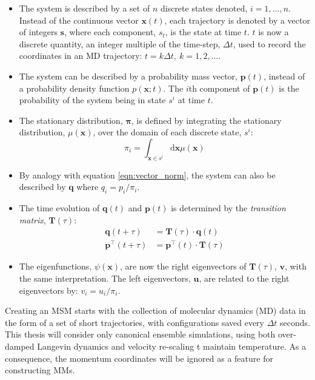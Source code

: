 \begin{itemize}
    \item The system is described by a set of $n$ discrete states denoted, $i=1, \ldots, n$. Instead of the continuous vector $\mathbf{x}(t)$, each trajectory is denoted by a vector of integers $\mathbf{s}$, where each component, $s_t$, is the state at time $t$. $t$ is now a discrete quantity, an integer multiple of the time-step, $\Delta t$, used to record the coordinates in an MD trajectory: $t=k\Delta t,\ k=1, 2, \ldots$. 
    \item The system can be described by a probability mass vector, $\mathbf{p}(t)$,  instead of a probability density function $p(\mathbf{x};t)$. The $i$th component of $\mathbf{p}(t)$ is the probability of the system being in  state $s^{i}$ at time $t$.
    \item The stationary distribution, $\bm{\pi}$, is defined by integrating the stationary distribution, $\mu(\mathbf{x})$, over the domain of each discrete state, $s^{i}$:
        \begin{equation*}
            \pi_{i}=\int_{\mathbf{x} \in s^{i}} \mathrm{d}\mathbf{x}\mu(\mathbf{x})
        \end{equation*}
    \item By analogy with equation \ref{eqn:vector_norm}, the system can also be described by $\mathbf{q}$ where $q_{i} = p_{i}/\pi_{i}$.
    \item The time evolution of $\mathbf{q}(t)$ and $\mathbf{p}(t)$ is determined by the \emph{transition matrix}, $\mathbf{T}(\tau)$:
        \begin{align*}
            \mathbf{q}(t+\tau) &= \mathbf{T}(\tau) \cdot \mathbf{q}(t) \\
            \mathbf{p}^{\top}(t+\tau) & = \mathbf{p}^{\top}(t)\cdot \mathbf{T}(\tau)
        \end{align*}
    \item The eigenfunctions, $\psi(\mathbf{x})$, are now the right eigenvectors of $\mathbf{T}(\tau)$, $\mathbf{v}$, with the same interpretation. The left eigenvectors, $\mathbf{u}$, are related to the right eigenvectors by: $v_{i} = u_{i}/\pi_{i}$.  
 \end{itemize}

Creating an MSM starts with the collection of molecular dynamics (MD) data in the form of a set of short trajectories, with configurations saved every $\Delta t$ seconds. This thesis will consider only canonical ensemble simulations, using both over-damped Langevin dynamics \cite{ermakComputerSimulationCharged1974}\cite{ermakEquilibriumElectrostaticEffects1974} and velocity re-scaling \cite{bussiCanonicalSamplingVelocity2007} t maintain temperature. As a consequence, the momentum coordinates will be ignored as a feature for constructing MMs. 


